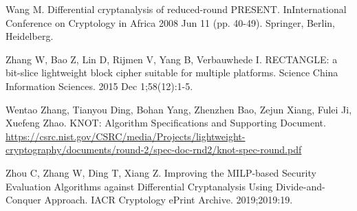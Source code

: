 \begin{thebibliography}{8}
Wang M. Differential cryptanalysis of reduced-round PRESENT. InInternational Conference on Cryptology in Africa 2008 Jun 11 (pp. 40-49). Springer, Berlin, Heidelberg.

Zhang W, Bao Z, Lin D, Rijmen V, Yang B, Verbauwhede I. RECTANGLE: a bit-slice lightweight block cipher suitable for multiple platforms. Science China Information Sciences. 2015 Dec 1;58(12):1-5.

Wentao Zhang, Tianyou Ding, Bohan Yang, Zhenzhen Bao, Zejun Xiang, Fulei Ji, Xuefeng Zhao. KNOT: Algorithm Specifications and Supporting Document. \url{https://csrc.nist.gov/CSRC/media/Projects/lightweight-cryptography/documents/round-2/spec-doc-rnd2/knot-spec-round.pdf}

Zhou C, Zhang W, Ding T, Xiang Z. Improving the MILP-based Security Evaluation Algorithms against Differential Cryptanalysis Using Divide-and-Conquer Approach. IACR Cryptology ePrint Archive. 2019;2019:19.





\end{thebibliography}